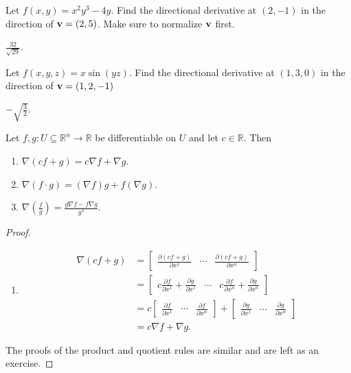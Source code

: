 \documentclass[12pt,letterpaper,reqno]{article}
\numberwithin{equation}{section}
\newcommand{\R}{\ensuremath{\mathbb R}}
\newcommand{\bv}{{\bf v}}
\begin{document}
{\begin{exercise}
Let $f(x,y)=x^2y^3-4y$. Find the directional derivative at $(2,-1)$ in the direction of $\bv=(2,5)$. Make sure to normalize $\bv$ first.	
\end{exercise}

{\color{red}
\begin{solution}
	$\frac{32}{\sqrt{29}}$.
\end{solution}}


\begin{exercise}
Let $f(x,y,z)=x \sin(yz)$. Find the directional derivative at $(1,3,0)$ in the direction of $\bv=(1,2,-1)$ 	
\end{exercise}

{\color{red}
\begin{solution}
	$-\sqrt{\frac{3}{2}}$.
\end{solution}}

\begin{thm}\label{thm:algebraic_properties_of_the_gradient}
Let $f,g:U \subseteq \R^n \to \R$ be differentiable on $U$ and let $c \in \R$. Then
	\begin{enumerate}
		\item $\nabla (cf+g)=c \nabla f+ \nabla g$.
		\item $\nabla(f \cdot g)=(\nabla f)g+f(\nabla g)$.
		\item $\nabla\left(\frac{f}{g}\right)=\frac{g \nabla f-f \nabla g}{g^2}$.
	\end{enumerate}
\end{thm}

\begin{proof}
\begin{enumerate}
	\item 
	\begin{align*}
		\nabla(cf+g)&= \begin{bmatrix}
			\frac{\partial (cf+g)}{\partial x^1} & \cdots & \frac{\partial (cf+g)}{\partial x^n}
		\end{bmatrix} \\
		&=\begin{bmatrix}
			c\frac{\partial f}{\partial x^1}+ \frac{\partial g}{\partial x^1}& \cdots & c\frac{\partial f}{\partial x^n}+\frac{\partial g}{\partial x^n}
		\end{bmatrix} \\
		&=c\begin{bmatrix}
			\frac{\partial f}{\partial x^1}& \cdots & \frac{\partial f}{\partial x^n}
		\end{bmatrix}+\begin{bmatrix}
			\frac{\partial g}{\partial x^1}& \cdots & \frac{\partial g}{\partial x^n}
		\end{bmatrix} \\
		&=c\nabla f+\nabla g.
			\end{align*}
\end{enumerate}
The proofs of the product and quotient rules are similar and are left as an exercise.
\end{proof}

}
\end{document}
